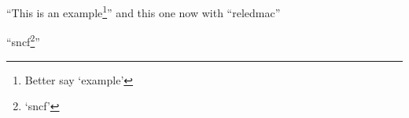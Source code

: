 \documentclass{article}
\begin{document}
\enquote{This is an example\footnote{Better say \enquote{example}}} and
this one now with \enquote{reledmac}

\beginnumbering
\pstart
\enquote{sncf\footnote{\enquote{sncf}}}
\pend
\endnumbering
\end{document}
